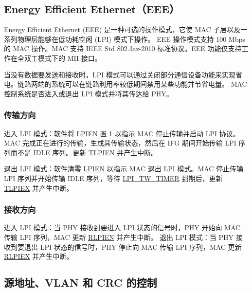 \documentclass[main\_\_CN.tex]{subfiles}
\begin{document}
\subsection{Energy Efficient Ethernet（EEE）}
Energy Efficient Ethernet (EEE) 是一种可选的操作模式，它使 MAC 子层以及一系列物理层能够在低功耗空闲 (LPI) 模式下操作。 EEE 操作模式支持 100 Mbps 的 MAC 操作。MAC 支持 IEEE Std 802.3az-2010 标准协议。EEE 功能仅支持工作在全双工模式下的 MII 接口。

当没有数据要发送和接收时，LPI 模式可以通过关闭部分通信设备功能来实现省电。链路两端的系统可以在链路利用率较低期间禁用某些功能并节省电量。 MAC 控制系统是否进入或退出 LPI 模式并将其传达给 PHY。

\subsubsection{传输方向}
进入 LPI 模式：软件将 \hyperref[regdesc:EMACLPICSRREG]{LPIEN} 置 1 以指示 MAC 停止传输并启动 LPI 协议。MAC 完成正在进行的传输，生成其传输状态，然后在 IFG 期间开始传输 LPI 序列而不是 IDLE 序列。更新 \hyperref[regdesc:EMACLPICSRREG]{TLPIEN} 并产生中断。

退出 LPI 模式：软件清零 \hyperref[regdesc:EMACLPICSRREG]{LPIEN} 以指示 MAC 退出 LPI 模式。MAC 停止传输 LPI 序列并开始传输 IDLE 序列，等待 \hyperref[regdesc:EMACLPITIMERSCONTROLREG]{LPI\_TW\_TIMER} 到期后，更新 \hyperref[regdesc:EMACLPICSRREG]{TLPIEX} 并产生中断。


\subsubsection{接收方向}
进入 LPI 模式：当 PHY 接收到要进入 LPI 状态的信号时，PHY 开始向 MAC 传输 LPI 序列，MAC 更新 \hyperref[regdesc:EMACLPICSRREG]{RLPIEN} 并产生中断。
退出 LPI 模式：当 PHY 接收到要退出 LPI 状态的信号时，PHY 停止向 MAC 传输 LPI 序列，MAC 更新 \hyperref[regdesc:EMACLPICSRREG]{RLPIEX} 并产生中断。

\subsection{源地址、VLAN 和 CRC 的控制}
\end{document}
